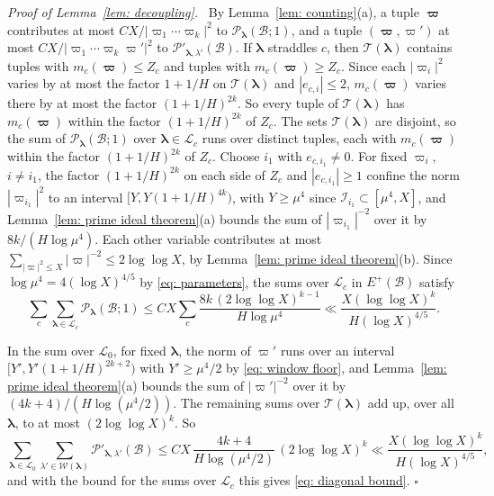 \documentclass{article}
\numberwithin{equation}{section}
\newenvironment{proof}[1][Proof]{\par\medskip\noindent\textit{#1.}\ }{\hfill$\square$\par\medskip}
\newcommand{\Le}{\leqslant}
\newcommand{\Ge}{\geqslant}
\begin{document}
\begin{proof}[Proof of Lemma~\ref{lem: decoupling}]
By Lemma~\ref{lem: counting}(a), a tuple $\boldsymbol{\varpi}$ contributes at most $CX/|\varpi_1 \cdots \varpi_k|^2$ to $\mathcal{P}_{\boldsymbol{\lambda}}(\mathcal{B}; 1)$, and a tuple $(\boldsymbol{\varpi}, \varpi')$ at most $CX/|\varpi_1 \cdots \varpi_k \varpi'|^2$ to $\mathcal{P}'_{\boldsymbol{\lambda},\lambda'}(\mathcal{B})$. If $\boldsymbol{\lambda}$ straddles $c$, then $\mathcal{T}(\boldsymbol{\lambda})$ contains tuples with $m_c(\boldsymbol{\varpi}) \Le Z_c$ and tuples with $m_c(\boldsymbol{\varpi}) \Ge Z_c$. Since each $|\varpi_i|^2$ varies by at most the factor $1 + 1/H$ on $\mathcal{T}(\boldsymbol{\lambda})$ and $|e_{c,i}| \Le 2$, $m_c(\boldsymbol{\varpi})$ varies there by at most the factor $(1 + 1/H)^{2k}$. So every tuple of $\mathcal{T}(\boldsymbol{\lambda})$ has $m_c(\boldsymbol{\varpi})$ within the factor $(1 + 1/H)^{2k}$ of $Z_c$. The sets $\mathcal{T}(\boldsymbol{\lambda})$ are disjoint, so the sum of $\mathcal{P}_{\boldsymbol{\lambda}}(\mathcal{B}; 1)$ over $\boldsymbol{\lambda} \in \mathcal{L}_c$ runs over distinct tuples, each with $m_c(\boldsymbol{\varpi})$ within the factor $(1 + 1/H)^{2k}$ of $Z_c$. Choose $i_1$ with $e_{c,i_1} \neq 0$. For fixed $\varpi_i$, $i \neq i_1$, the factor $(1 + 1/H)^{2k}$ on each side of $Z_c$ and $|e_{c,i_1}| \Ge 1$ confine the norm $|\varpi_{i_1}|^2$ to an interval $[Y, Y(1 + 1/H)^{4k})$, with $Y \Ge \mu^4$ since $\mathcal{I}_{i_1} \subset [\mu^4, X]$, and Lemma~\ref{lem: prime ideal theorem}(a) bounds the sum of $|\varpi_{i_1}|^{-2}$ over it by $8k/(H \log \mu^4)$. Each other variable contributes at most $\sum_{|\varpi|^2 \Le X} |\varpi|^{-2} \Le 2\log\log X$, by Lemma~\ref{lem: prime ideal theorem}(b). Since $\log \mu^4 = 4(\log X)^{4/5}$ by \eqref{eq: parameters}, the sums over $\mathcal{L}_c$ in $E^+(\mathcal{B})$ satisfy
\begin{equation*}
\sum_c \sum_{\boldsymbol{\lambda} \in \mathcal{L}_c} \mathcal{P}_{\boldsymbol{\lambda}}(\mathcal{B}; 1) \Le C X \sum_c \frac{8k\, (2\log\log X)^{k-1}}{H \log \mu^4} \ll \frac{X (\log\log X)^k}{H (\log X)^{4/5}}.
\end{equation*}

In the sum over $\mathcal{L}_0$, for fixed $\boldsymbol{\lambda}$, the norm of $\varpi'$ runs over an interval $[Y', Y'(1 + 1/H)^{2k+2})$ with $Y' \Ge \mu^4/2$ by \eqref{eq: window floor}, and Lemma~\ref{lem: prime ideal theorem}(a) bounds the sum of $|\varpi'|^{-2}$ over it by $(4k + 4)/(H \log(\mu^4/2))$. The remaining sums over $\mathcal{T}(\boldsymbol{\lambda})$ add up, over all $\boldsymbol{\lambda}$, to at most $(2\log\log X)^k$. So
\begin{equation*}
\sum_{\boldsymbol{\lambda} \in \mathcal{L}_0} \sum_{\lambda' \in \mathcal{W}(\boldsymbol{\lambda})} \mathcal{P}'_{\boldsymbol{\lambda},\lambda'}(\mathcal{B}) \Le C X\, \frac{4k + 4}{H \log(\mu^4/2)}\, (2\log\log X)^k \ll \frac{X (\log\log X)^k}{H (\log X)^{4/5}},
\end{equation*}
and with the bound for the sums over $\mathcal{L}_c$ this gives \eqref{eq: diagonal bound}.
\end{proof}
\end{document}
